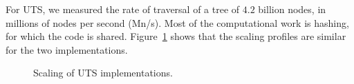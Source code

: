For UTS, we measured the rate of traversal of a tree of $4.2$ billion nodes, in
millions of nodes per second (Mn/s). Most of the computational work is hashing, for
which the code is shared. Figure~\ref{fig:uts-scaling} shows that the scaling
profiles are similar for the two implementations. 

\begin{figure}
\hspace{-0.2cm}
\begingroup\graphicspath{{figures/}}\endgroup
\caption{Scaling of UTS implementations.}
\label{fig:uts-scaling}
\end{figure}



